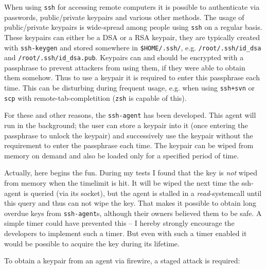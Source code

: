 When using \texttt{ssh} for accessing remote computers it is possible to
authenticate via passwords, public/private keypairs and various other methods.
The usage of public/private keypairs is wide-spread among people using
\texttt{ssh} on a regular basis. These keypairs can either be a DSA or a RSA
keypair, they are typically created with \texttt{ssh-keygen} and stored
somewhere in \texttt{\$HOME/.ssh/}, e.g.  \texttt{/root/.ssh/id\_dsa} and
\texttt{/root/.ssh/id\_dsa.pub}. Keypairs can and should be encrypted with a
passphrase to prevent attackers from using them, if they were able to obtain
them somehow. Thus to use a keypair it is required to enter this passphrase each
time. This can be disturbing during frequent usage, e.g. when using
\texttt{ssh+svn} or \texttt{scp} with remote-tab-completition (\texttt{zsh} is
capable of this).

For these and other reasons, the \texttt{ssh-agent} has been developed. This
agent will run in the background; the user can store a keypair into it (once
entering the passphrase to unlock the keypair) and successively use the keypair
without the requirement to enter the passphrase each time. The keypair can be
wiped from memory on demand and also be loaded only for a specified period of
time.

Actually, here begins the fun. During my tests I found that the key is
\emph{not} wiped from memory when the timelimit is hit. It will be wiped the
next time the ssh-agent is queried (via its socket), but the agent is stalled in
a \emph{read}-systemcall until this query and thus can not wipe the key. That
makes it possible to obtain long overdue keys from \texttt{ssh-agent}s, although
their owners believed them to be safe. A simple timer could have prevented this
-- I hereby strongly encourage the developers to implement such a timer. But
even with such a timer enabled it would be possible to acquire the key during
its lifetime.

To obtain a keypair from an agent via firewire, a staged attack is required:

